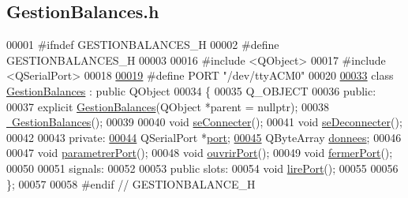 \hypertarget{_gestion_balances_8h_source}{}\subsection{Gestion\+Balances.\+h}
\label{_gestion_balances_8h_source}

\begin{DoxyCode}
00001 \textcolor{preprocessor}{#ifndef GESTIONBALANCES\_H}
00002 \textcolor{preprocessor}{#define GESTIONBALANCES\_H}
00003 
00016 \textcolor{preprocessor}{#include <QObject>}
00017 \textcolor{preprocessor}{#include <QSerialPort>}
00018 
\hyperlink{_gestion_balances_8h_a614217d263be1fb1a5f76e2ff7be19a2}{00019} \textcolor{preprocessor}{#define PORT "/dev/ttyACM0"}
00020 
\hyperlink{class_gestion_balances}{00033} \textcolor{keyword}{class }\hyperlink{class_gestion_balances}{GestionBalances} : \textcolor{keyword}{public} QObject
00034 \{
00035     Q\_OBJECT
00036 \textcolor{keyword}{public}:
00037     \textcolor{keyword}{explicit} \hyperlink{class_gestion_balances_a68f1e2d248971ff912f4ce5e2a24b6ef}{GestionBalances}(QObject *parent = \textcolor{keyword}{nullptr});
00038      \hyperlink{class_gestion_balances_a6cb93817424cba3ac1f1593f5948d2ee}{~GestionBalances}();
00039 
00040    \textcolor{keywordtype}{void} \hyperlink{class_gestion_balances_ac3bb603b39f9b89732da2dc576903924}{seConnecter}();
00041    \textcolor{keywordtype}{void} \hyperlink{class_gestion_balances_a25880f41779aa8fdeac7ae972b09ff36}{seDeconnecter}();
00042 
00043 \textcolor{keyword}{private}:
\hyperlink{class_gestion_balances_a7e40205180eb65dab0b5cdebd628f794}{00044}    QSerialPort *\hyperlink{class_gestion_balances_a7e40205180eb65dab0b5cdebd628f794}{port};
\hyperlink{class_gestion_balances_acb44214ef5e441e89e0525f567079af3}{00045}    QByteArray \hyperlink{class_gestion_balances_acb44214ef5e441e89e0525f567079af3}{donnees};
00046 
00047    \textcolor{keywordtype}{void} \hyperlink{class_gestion_balances_aca48b0074aaef7b8d4d9da45c3d6a3a9}{parametrerPort}();
00048    \textcolor{keywordtype}{void} \hyperlink{class_gestion_balances_a8d7031310e6b9530c0a9e47c142aaf39}{ouvrirPort}();
00049    \textcolor{keywordtype}{void} \hyperlink{class_gestion_balances_a4c59a33f55b0c97f0ea4fb63b7791c0c}{fermerPort}();
00050 
00051 signals:
00052 
00053 \textcolor{keyword}{public} slots:
00054    \textcolor{keywordtype}{void} \hyperlink{class_gestion_balances_a4f3f6a424fce484321d239fa9f7fa15f}{lirePort}();
00055 
00056 \};
00057 
00058 \textcolor{preprocessor}{#endif // GESTIONBALANCE\_H}
\end{DoxyCode}
